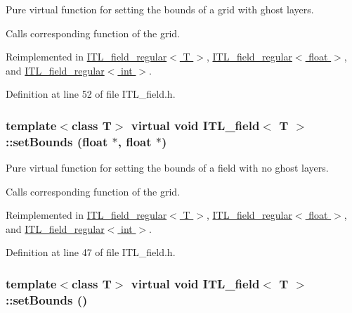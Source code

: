 Pure virtual function for setting the bounds of a grid with ghost layers. 

Calls corresponding function of the grid. 

Reimplemented in \hyperlink{classITL__field__regular_aa7897cdf06b261236e0efdab0987be9f}{ITL\_\-field\_\-regular$<$ T $>$}, \hyperlink{classITL__field__regular_aa7897cdf06b261236e0efdab0987be9f}{ITL\_\-field\_\-regular$<$ float $>$}, and \hyperlink{classITL__field__regular_aa7897cdf06b261236e0efdab0987be9f}{ITL\_\-field\_\-regular$<$ int $>$}.



Definition at line 52 of file ITL\_\-field.h.

\hypertarget{classITL__field_a7bf82ed82a338d34985a6758307c8ece}{
\subsubsection[{setBounds}]{\setlength{\rightskip}{0pt plus 5cm}template$<$class T$>$ virtual void {\bf ITL\_\-field}$<$ T $>$::setBounds (float $\ast$, \/  float $\ast$)}}
\label{classITL__field_a7bf82ed82a338d34985a6758307c8ece}


Pure virtual function for setting the bounds of a field with no ghost layers. 

Calls corresponding function of the grid. 

Reimplemented in \hyperlink{classITL__field__regular_a96d8e5cc41ae4e63671d43764056d161}{ITL\_\-field\_\-regular$<$ T $>$}, \hyperlink{classITL__field__regular_a96d8e5cc41ae4e63671d43764056d161}{ITL\_\-field\_\-regular$<$ float $>$}, and \hyperlink{classITL__field__regular_a96d8e5cc41ae4e63671d43764056d161}{ITL\_\-field\_\-regular$<$ int $>$}.



Definition at line 47 of file ITL\_\-field.h.

\hypertarget{classITL__field_a134f7a48123be7d3fbfcb52b4bcbb5c8}{
\subsubsection[{setBounds}]{\setlength{\rightskip}{0pt plus 5cm}template$<$class T$>$ virtual void {\bf ITL\_\-field}$<$ T $>$::setBounds ()}}
\label{classITL__field_a134f7a48123be7d3fbfcb52b4bcbb5c8}


